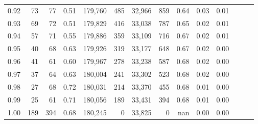 \begin{tabular}{rrrrrrrrrrrrrr}
0.92 &     73 &   77 &  0.51 &  179,760 &      485 &  32,966 &     859 &  0.64 &  0.03 &      0.01 \\
0.93 &     69 &   72 &  0.51 &  179,829 &      416 &  33,038 &     787 &  0.65 &  0.02 &      0.01 \\
0.94 &     57 &   71 &  0.55 &  179,886 &      359 &  33,109 &     716 &  0.67 &  0.02 &      0.01 \\
0.95 &     40 &   68 &  0.63 &  179,926 &      319 &  33,177 &     648 &  0.67 &  0.02 &      0.00 \\
0.96 &     41 &   61 &  0.60 &  179,967 &      278 &  33,238 &     587 &  0.68 &  0.02 &      0.00 \\
0.97 &     37 &   64 &  0.63 &  180,004 &      241 &  33,302 &     523 &  0.68 &  0.02 &      0.00 \\
0.98 &     27 &   68 &  0.72 &  180,031 &      214 &  33,370 &     455 &  0.68 &  0.01 &      0.00 \\
0.99 &     25 &   61 &  0.71 &  180,056 &      189 &  33,431 &     394 &  0.68 &  0.01 &      0.00 \\
1.00 &    189 &  394 &  0.68 &  180,245 &        0 &  33,825 &       0 &   nan &  0.00 &      0.00 \\
\bottomrule
\end{tabular}
